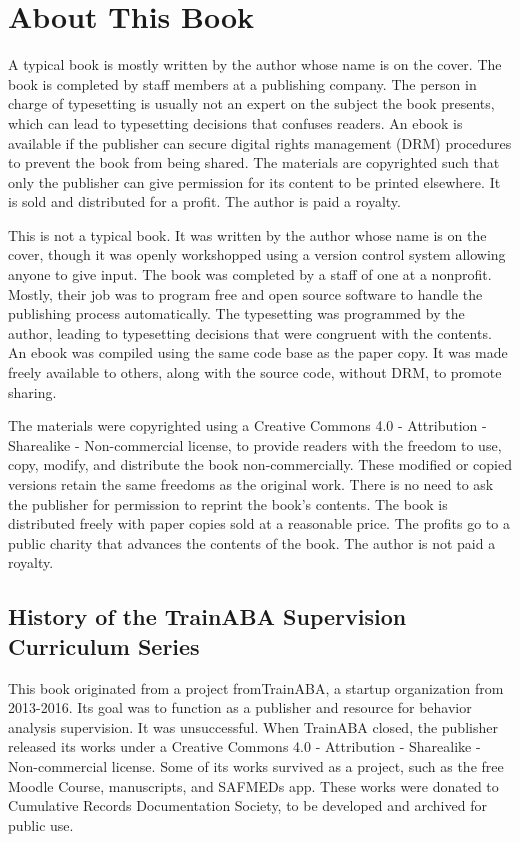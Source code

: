 \chapter{About This Book}

A typical book is mostly written by the author whose name is on the cover. The book is completed by staff members at a publishing company. The person in charge of typesetting is usually not an expert on the subject the book presents, which can lead to typesetting decisions that confuses readers. An ebook is available if the publisher can secure digital rights management (DRM) procedures to prevent the book from being shared. The materials are copyrighted such that only the publisher can give permission for its content to be printed elsewhere. It is sold and distributed for a profit. The author is paid a royalty.

This is not a typical book. It was written by the author whose name is on the cover, though it was openly workshopped using a version control system allowing anyone to give input. The book was completed by a staff of one at a nonprofit. Mostly, their job was to program free and open source software to handle the publishing process automatically. The typesetting was programmed by the author, leading to typesetting decisions that were congruent with the contents. An ebook was compiled using the same code base as the paper copy. It was made freely available to others, along with the source code, without DRM, to promote sharing.

The materials were copyrighted using a Creative Commons 4.0 - Attribution - Sharealike - Non-commercial license, to provide readers with the freedom to use, copy, modify, and distribute the book non-commercially. These modified or copied versions retain the same freedoms as the original work. There is no need to ask the publisher for permission to reprint the book's contents. The book is distributed freely with paper copies sold at a reasonable price. The profits go to a public charity that advances the contents of the book. The author is not paid a royalty.

\section{History of the TrainABA Supervision Curriculum Series}
This book originated from a project fromTrainABA, a startup organization from 2013-2016. Its goal was to function as a publisher and resource for behavior analysis supervision. It was unsuccessful. When TrainABA closed, the publisher released its works under a Creative Commons 4.0 - Attribution - Sharealike - Non-commercial license. Some of its works survived as a project, such as the free Moodle Course, manuscripts, and SAFMEDs app. These works were donated to Cumulative Records Documentation Society, to be developed and archived for public use. 

